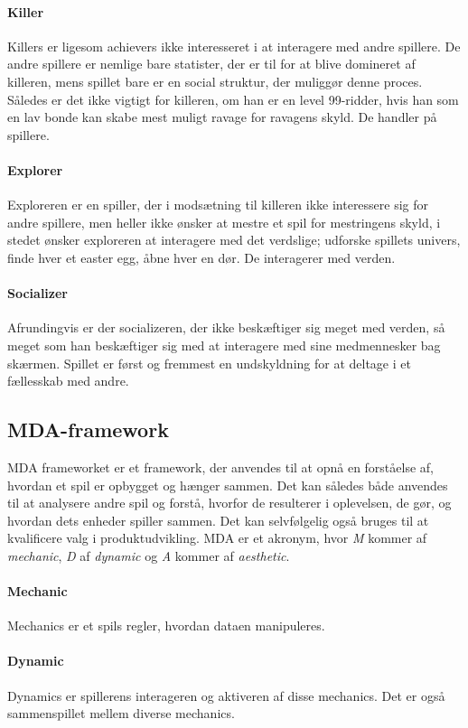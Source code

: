 \paragraph{Killer}
Killers er ligesom achievers ikke interesseret i at interagere med andre spillere. De andre spillere er nemlige bare statister, der er til for at blive domineret af killeren, mens spillet bare er en social struktur, der muliggør denne proces. Således er det ikke vigtigt for killeren, om han er en level 99-ridder, hvis han som en lav bonde kan skabe mest muligt ravage for ravagens skyld. De handler på spillere.
\paragraph{Explorer}
Exploreren er en spiller, der i modsætning til killeren ikke interessere sig for andre spillere, men heller ikke ønsker at mestre et spil for mestringens skyld, i stedet ønsker exploreren at interagere med det verdslige; udforske spillets univers, finde hver et easter egg, åbne hver en dør. De interagerer med verden.
\paragraph{Socializer}
Afrundingvis er der socializeren, der ikke beskæftiger sig meget med verden, så meget som han beskæftiger sig med at interagere med sine medmennesker bag skærmen. Spillet er først og fremmest en undskyldning for at deltage i et fællesskab med andre.

\subsection{MDA-framework}
MDA frameworket er et framework, der anvendes til at opnå en forståelse af, hvordan et spil er opbygget og hænger sammen. Det kan således både anvendes til at analysere andre spil og forstå, hvorfor de resulterer i oplevelsen, de gør, og hvordan dets enheder spiller sammen. Det kan selvfølgelig også bruges til at kvalificere valg i produktudvikling. MDA er et akronym, hvor \textit{M} kommer af \textit{mechanic}, \textit{D} af \textit{dynamic} og \textit{A} kommer af \textit{aesthetic}.
\paragraph{Mechanic} Mechanics er et spils regler, hvordan dataen manipuleres.
\paragraph{Dynamic} Dynamics er spillerens interageren og aktiveren af disse mechanics. Det er også sammenspillet mellem diverse mechanics.
